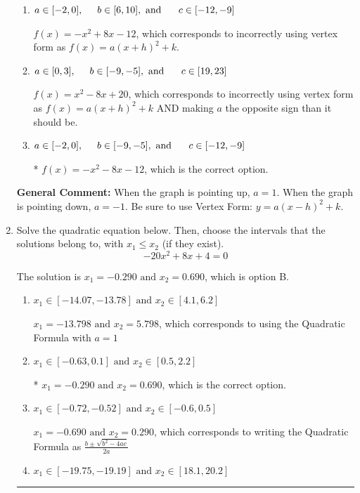 \documentclass{extbook}[14pt]
\newcommand{\litem}[1]{\item #1

\rule{\textwidth}{0.4pt}}
\begin{document}
\begin{enumerate}
{\begin{enumerate}[label=\Alph*.]
$f(x)=x^{2} +8 x + 20$, which corresponds to making $a$ the opposite sign than it should be.
\item \( a \in [-2, 0], \hspace*{5mm} b \in [6, 10], \text{ and } \hspace*{5mm} c \in [-12, -9] \)

$f(x)=-x^{2} +8 x -12$, which corresponds to incorrectly using vertex form as $f(x) = a(x+h)^2+k$.
\item \( a \in [0, 3], \hspace*{5mm} b \in [-9, -5], \text{ and } \hspace*{5mm} c \in [19, 23] \)

$f(x)=x^{2} -8 x + 20$, which corresponds to incorrectly using vertex form as $f(x) = a(x+h)^2+k$ AND making $a$ the opposite sign than it should be.
\item \( a \in [-2, 0], \hspace*{5mm} b \in [-9, -5], \text{ and } \hspace*{5mm} c \in [-12, -9] \)

* $f(x)=-x^{2} -8 x -12$, which is the correct option.
\end{enumerate}

\textbf{General Comment:} When the graph is pointing up, $a=1$. When the graph is pointing down, $a=-1$. Be sure to use Vertex Form: $y = a(x-h)^2+k$.
}
\litem{
Solve the quadratic equation below. Then, choose the intervals that the solutions belong to, with $x_1 \leq x_2$ (if they exist).
\[ -20x^{2} +8 x + 4 = 0 \]

The solution is \( x_1 = -0.290 \text{ and } x_2 = 0.690 \), which is option B.\begin{enumerate}[label=\Alph*.]
\item \( x_1 \in [-14.07, -13.78] \text{ and } x_2 \in [4.1, 6.2] \)

 $x_1 = -13.798 \text{ and } x_2 = 5.798$, which corresponds to using the Quadratic Formula with $a=1$
\item \( x_1 \in [-0.63, 0.1] \text{ and } x_2 \in [0.5, 2.2] \)

* $x_1 = -0.290 \text{ and } x_2 = 0.690$, which is the correct option.
\item \( x_1 \in [-0.72, -0.52] \text{ and } x_2 \in [-0.6, 0.5] \)

 $x_1 = -0.690 \text{ and } x_2 = 0.290$, which corresponds to writing the Quadratic Formula as $\frac{b \pm \sqrt{b^2 - 4ac}}{2a}$
\item \( x_1 \in [-19.75, -19.19] \text{ and } x_2 \in [18.1, 20.2] \)


\end{enumerate}}
\end{enumerate}
\end{document}
